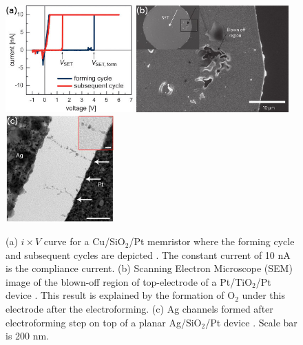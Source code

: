 \begin{center}
  \begin{figure}[h!]
    \begin{center}
      \includegraphics[height=4.1cm]{img/Wasser2009-electroform.jpg}
      \includegraphics[height=4.1cm]{img/Kwon2010NatureNanoBolhas.jpg}
      \includegraphics[height=4.1cm]{img/Yang2012NatureCommCanais.jpg}
      \caption{(a) $i \times V$ curve for a Cu/SiO$_2$/Pt memristor where the forming cycle and subsequent cycles are depicted \cite{Waser2009}. The constant current of 10 nA is the compliance current. (b) Scanning Electron Microscope (SEM) image of the blown-off region of top-electrode of a Pt/TiO$_2$/Pt device \cite{Miao2011a}. This result is explained by the formation of O$_2$ under this electrode after the electroforming. (c) Ag channels formed after electroforming step on top of a planar Ag/SiO$_2$/Pt device \cite{Yang2012}. Scale bar is 200 nm.} 
      \label{fig:electroform-channel} 
    \end{center}
  \end{figure}
\end{center}

